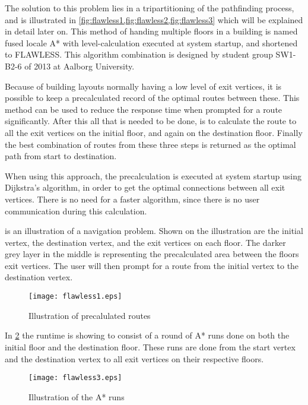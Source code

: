 The solution to this problem lies in a tripartitioning of the pathfinding process, and is illustrated in \cref{fig:flawless1,fig:flawless2,fig:flawless3} which will be explained in detail later on. This method of handing multiple floors in a building is named fused locale A* with level-calculation executed at system startup, and shortened to FLAWLESS. This algorithm combination is designed by student group SW1-B2-6 of 2013 at Aalborg University.

Because of building layouts normally having a low level of exit vertices, it is possible to keep a precalculated record of the optimal routes between these. This method can be used to reduce the response time when prompted for a route significantly.
After this all that is needed to be done, is to calculate the route to all the exit vertices on the initial floor, and again on the destination floor. Finally the best combination of routes from these three steps is returned as the optimal path from start to destination.

When using this approach, the precalculation is executed at system startup using Dijkstra's algorithm, in order to get the optimal connections between all exit vertices. There is no need for a faster algorithm, since there is no user communication during this calculation.

 is an illustration of a navigation problem. Shown on the illustration are the initial vertex, the destination vertex, and the exit vertices on each floor. The darker grey layer in the middle is representing the precalculated area between the floors exit vertices. The user will then prompt for a route from the initial vertex to the destination vertex.

\begin{figure}[ht!]
    \centering
    \texttt{[image: flawless1.eps]}
    \caption{Illustration of precalulated routes}
    \label{fig:flawless1}
  \end{figure}

In \cref{fig:flawless2} the runtime is showing to consist of a round of A* runs done on both the initial floor and the destination floor. These runs are done from the start vertex and the destination vertex to all exit vertices on their respective floors.

\begin{figure}[ht!]
    \centering
    \texttt{[image: flawless3.eps]}
    \caption{Illustration of the A* runs}
    \label{fig:flawless2}
  \end{figure}

